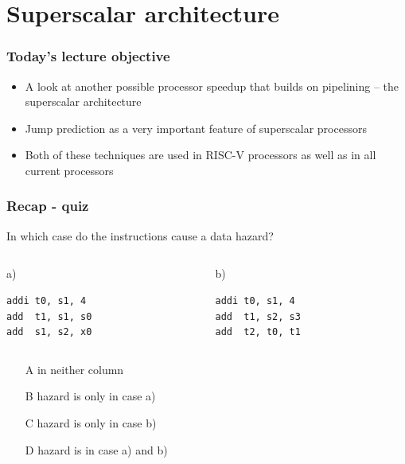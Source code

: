 \documentclass{beamer}
\subtitle{Lecture 06. Branch and Speculative Execution}
\author{Pavel Píša \phantom{xxxxxxx} Petr Štěpán \\ \small\texttt{pisa@fel.cvut.cz} \phantom{xx} \small\texttt{stepan@fel.cvut.cz} \\
\phantom{xxxxxxxxx} \\
License: CC-BY-SA}
\begin{document}
\maketitle

\section{Superscalar architecture}

\begin{frame}
\frametitle{Today's lecture objective}

\begin{itemize}
 \item A look at another possible processor speedup that builds on pipelining -- the superscalar architecture
 \item Jump prediction as a very important feature of superscalar processors
 \item Both of these techniques are used in RISC-V processors as well as in all current processors
\end{itemize}

\end{frame}

\begin{frame}[fragile]
\frametitle{Recap - quiz}

In which case do the instructions cause a data hazard?

\begin{columns}[T]
\begin{column}{0.40\textwidth}
\phantom{xxxxx}a)

\begin{verbatim}
addi t0, s1, 4
add  t1, s1, s0
add  s1, s2, x0
\end{verbatim}
\end{column}
\begin{column}{0.40\textwidth}
\phantom{xxxxx}b)

\begin{verbatim}
addi t0, s1, 4
add  t1, s2, s3
add  t2, t0, t1
\end{verbatim}
\end{column}
\end{columns}
\bigskip
\begin{itemize}
 \item[A] in neither column
 \item[B] hazard is only in case a)
 \item[C] hazard is only in case b)
 \item[D] hazard is in case a) and b)
\end{itemize}

\end{frame}
\end{document}
